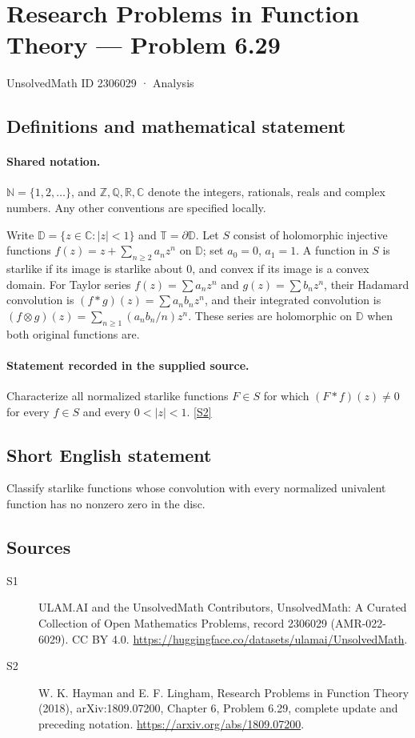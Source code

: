 \documentclass[11pt]{article}
\newcommand{\sref}[2]{\hyperlink{source:#1:#2}{[S#2]}}
\begin{document}
\setcounter{section}{2306028}
\section{Research Problems in Function Theory — Problem 6.29}\label{2306029}
{\small\sffamily UnsolvedMath ID 2306029 · Analysis}
\subsection{Definitions and mathematical statement}

\paragraph{Shared notation.}$\mathbb N=\{1,2,\ldots\}$, and $\mathbb Z,\mathbb Q,\mathbb R,\mathbb C$ denote the integers, rationals, reals and complex numbers. Any other conventions are specified locally.


Write $\mathbb D=\{z\in\mathbb C:|z|<1\}$ and $\mathbb T=\partial\mathbb D$. Let $S$ consist of holomorphic injective functions $f(z)=z+\sum_{n\ge2}a_nz^n$ on $\mathbb D$; set $a_0=0$, $a_1=1$. A function in $S$ is starlike if its image is starlike about $0$, and convex if its image is a convex domain. For Taylor series $f(z)=\sum a_nz^n$ and $g(z)=\sum b_nz^n$, their Hadamard convolution is $(f*g)(z)=\sum a_nb_nz^n$, and their integrated convolution is $(f\otimes g)(z)=\sum_{n\ge1}(a_nb_n/n)z^n$. These series are holomorphic on $\mathbb D$ when both original functions are.
\paragraph{Statement recorded in the supplied source.}
Characterize all normalized starlike functions $F\in S$ for which $(F*f)(z)\ne0$ for every $f\in S$ and every $0<|z|<1$. \sref{2306029}{2}
\subsection{Short English statement}
Classify starlike functions whose convolution with every normalized univalent function has no nonzero zero in the disc.
\subsection{Sources}
\begin{description}
\item[\hypertarget{source:2306029:1}{S1}] ULAM.AI and the UnsolvedMath Contributors, UnsolvedMath: A Curated Collection of Open Mathematics Problems, record 2306029 (AMR-022-6029). CC BY 4.0. \url{https://huggingface.co/datasets/ulamai/UnsolvedMath}.
\item[\hypertarget{source:2306029:2}{S2}] W. K. Hayman and E. F. Lingham, Research Problems in Function Theory (2018), arXiv:1809.07200, Chapter 6, Problem 6.29, complete update and preceding notation. \url{https://arxiv.org/abs/1809.07200}.
\end{description}
\label{end:2306029}
\end{document}
